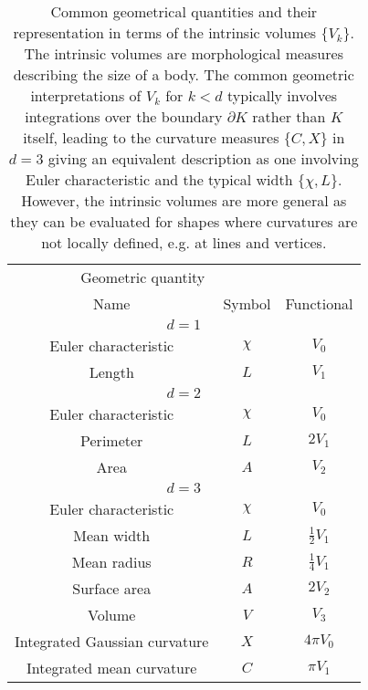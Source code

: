 \begin{SCtable}
  \begin{minipage}[b]{\linewidth}
    \centering
    \begin{tabular}{ccc}
      \toprule
      \multicolumn{2}{c}{Geometric quantity} \\
      \cmidrule(r){1-2}
      Name & Symbol & Functional \\
      \midrule
      \multicolumn{3}{c}{$d = 1$} \\
      \midrule
      Euler characteristic & $\chi$ & $V_0$ \\
      Length & $L$ & $V_1$ \\
      \midrule
      \multicolumn{3}{c}{$d = 2$} \\
      \midrule
      Euler characteristic & $\chi$ & $V_0$ \\
      Perimeter & $L$ & $2 V_1$ \\
      Area & $A$ & $V_2$ \\
      \midrule
      \multicolumn{3}{c}{$d = 3$} \\
      \midrule
      Euler characteristic & $\chi$ & $V_0$ \\
      Mean width & $L$ & $\frac{1}{2} V_1$ \\
      Mean radius & $R$ & $\frac{1}{4} V_1$ \\
      Surface area & $A$ & $2 V_2$ \\
      Volume & $V$ & $V_3$ \\
      Integrated Gaussian curvature & $X$ & $4 \pi V_0$ \\
      Integrated mean curvature & $C$ & $\pi V_1$ \\
      \bottomrule
    \end{tabular}
  \end{minipage}
  \caption[Common geometrical quantities in relation to the intrinsic volumes]{
    Common geometrical quantities and their representation in terms of the intrinsic volumes $\{V_k\}$.
    The intrinsic volumes are morphological measures describing the size of a body.
    The common geometric interpretations of $V_k$ for $k < d$ typically involves integrations over the boundary $\partial K$ rather than $K$ itself, leading to the curvature measures $\{C,X\}$ in $d=3$ giving an equivalent description as one involving Euler characteristic and the typical width $\{\chi, L\}$.
    However, the intrinsic volumes are more general as they can be evaluated for shapes where curvatures are not locally defined, e.g. at lines and vertices.}
  \label{table:geometric-quantities}
\end{SCtable}


